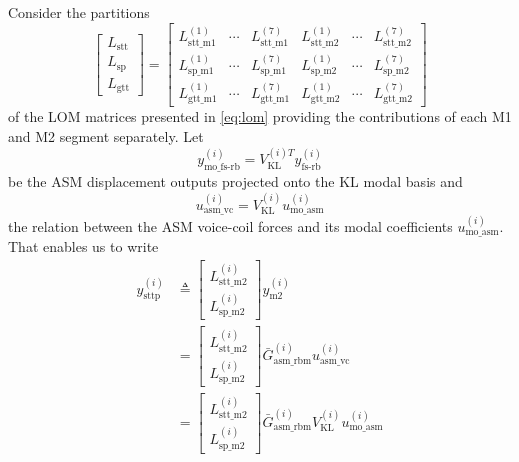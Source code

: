 \documentclass{gmto}
\begin{document}
Consider the partitions
\begin{equation}
\label{eq:decomp_lom}
    \begin{bmatrix} 
    L_\text{stt} \\ L_\text{sp} \\ L_\text{gtt}
    \end{bmatrix}
    =
    \begin{bmatrix}
        L_\text{stt\_m1}^{(1)} & \cdots & L_\text{stt\_m1}^{(7)} & L_\text{stt\_m2}^{(1)} & \cdots & L_\text{stt\_m2}^{(7)} \\ L_\text{sp\_m1}^{(1)} & \cdots & L_\text{sp\_m1}^{(7)} & L_\text{sp\_m2}^{(1)} & \cdots & L_\text{sp\_m2}^{(7)} \\ L_\text{gtt\_m1}^{(1)} & \cdots & L_\text{gtt\_m1}^{(7)} & L_\text{gtt\_m2}^{(1)} & \cdots & L_\text{gtt\_m2}^{(7)}
    \end{bmatrix}
\end{equation}
of the LOM matrices presented in \eqref{eq:lom} providing the contributions of each M1 and M2 segment separately. Let
\begin{equation} \label{eq:mo_y}
    y_\text{mo\_fs-rb}^{(i)} = V_\text{KL}^{(i)T} y_\text{fs-rb}^{(i)}
\end{equation}
be the ASM displacement outputs projected onto the KL modal basis and
\begin{equation} \label{eq:mo_u}
    u_\text{asm\_vc}^{(i)} = V_\text{KL}^{(i)} u_\text{mo\_asm}^{(i)}
\end{equation}
the relation between the ASM voice-coil forces and its modal coefficients $u_\text{mo\_asm}^{(i)}$. %
%
That enables us to write
\begin{align}
    y_\text{sttp}^{(i)} &\triangleq \begin{bmatrix}
        L_\text{stt\_m2}^{(i)} \\ L_\text{sp\_m2}^{(i)}
    \end{bmatrix} y_\text{m2}^{(i)} \nonumber \\
    & = \begin{bmatrix}
        L_\text{stt\_m2}^{(i)} \\ L_\text{sp\_m2}^{(i)}
    \end{bmatrix}
    \bar{G}_\text{asm\_rbm}^{(i)}
    u_\text{asm\_vc}^{(i)} \nonumber \\
    \label{eq:asm2ttp}
    & = \begin{bmatrix}
        L_\text{stt\_m2}^{(i)} \\ L_\text{sp\_m2}^{(i)}
    \end{bmatrix}
    \bar{G}_\text{asm\_rbm}^{(i)}
    V_\text{KL}^{(i)} u_\text{mo\_asm}^{(i)}
\end{align}
\end{document}

